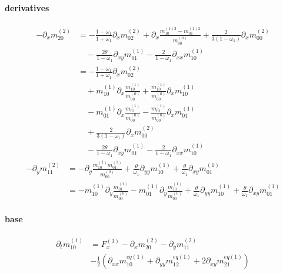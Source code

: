 \documentclass{article}
\begin{document}
  \paragraph{derivatives}
  \begin{equation}
    \tag{C5}
    \begin{aligned}
      - \partial_x m_{20}^{(2)} &= -\frac{1-\omega_1}{1+\omega_1} \partial_x m_{02}^{(2)}
      + \partial_x \frac{ m_{10}^{(1)2} - m_{01}^{(1)2}}{m_{00}^{(0)}} + \frac{ 2}{3(1-\omega_1)}\partial_x m_{00}^{(2)}
      \\&\quad
      - \frac{2\theta}{1-\omega_1}\partial_{xy} m_{01}^{(1)} - \frac{2}{1-\omega_1}\partial_{xx} m_{10}^{(1)}
      \\&=
      -\frac{1-\omega_1}{1+\omega_1} \partial_x m_{02}^{(2)}
      \\&\quad
      + m_{10}^{(1)}\partial_x \frac{  m_{10}^{(1)}}{m_{00}^{(0)}} + \frac{ m_{10}^{(1)}}{m_{00}^{(0)}} \partial_x  m_{10}^{(1)}
      \\&\quad
      - m_{01}^{(1)}\partial_x \frac{  m_{01}^{(1)}}{m_{00}^{(0)}} - \frac{ m_{01}^{(1)}}{m_{00}^{(0)}} \partial_x  m_{01}^{(1)}
      \\&\quad
      + \frac{ 2}{3(1-\omega_1)}\partial_x m_{00}^{(2)}
      \\&\quad
      - \frac{2\theta}{1-\omega_1}\partial_{xy} m_{01}^{(1)} - \frac{2}{1-\omega_1}\partial_{xx} m_{10}^{(1)}
    \end{aligned}
  \end{equation}
  \begin{equation}
    \tag{C6}
    \begin{aligned}
    -\partial_y m_{11}^{(2)} &=  -\partial_y \frac{ m_{10}^{(1)}m_{01}^{(1)}}{m_{00}^{(0)}}
    + \frac{\theta}{\omega_1}\partial_{yy} m_{10}^{(1)} + \frac{\theta}{\omega_1}\partial_{xy} m_{01}^{(1)}
    \\&=
    -m_{10}^{(1)}\partial_y \frac{ m_{01}^{(1)}}{m_{00}^{(0)}}-m_{01}^{(1)}\partial_y \frac{ m_{10}^{(1)}}{m_{00}^{(0)}}
  + \frac{\theta}{\omega_1}\partial_{yy} m_{10}^{(1)} + \frac{\theta}{\omega_1}\partial_{xy} m_{01}^{(1)}
    \end{aligned}
  \end{equation}

  \pagebreak
  \paragraph{base}
  \begin{equation*}
    \begin{aligned}
    \partial_t m_{10}^{(1)}
     & =
      F_x^{(3)}
      - \partial_x m_{20}^{(2)} - \partial_y m_{11}^{(2)} \\
      &
      - \frac{1}{2} \left(\partial_{xx} m_{10}^{eq(1)} + \partial_{yy} m_{12}^{eq(1)} + 2\partial_{xy} m_{21}^{eq(1)}\right)
    \end{aligned}
  \end{equation*}
\end{document}
